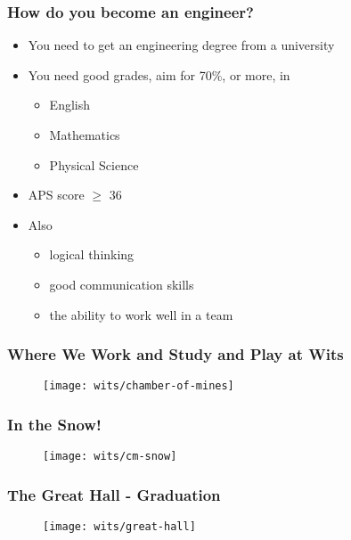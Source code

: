 \documentclass{beamer}
\begin{document}
\begin{frame}
\frametitle{How do you become an engineer?}
  \begin{itemize}
    \item You need to get an engineering degree from a university
    \item You need good grades, aim for 70\%, or more, in
    \begin{itemize}
      \item English
      \item Mathematics
      \item Physical Science 
    \end{itemize}
    \item APS score $\ge$ 36 
    \item Also 
    \begin{itemize}
       \item logical thinking
       \item good communication skills
       \item the ability to work well in a team
  \end{itemize}
  \end{itemize}
\end{frame}

\begin{frame}
  \frametitle{Where We Work and Study and Play at Wits}
  \begin{figure}
  \centering
  \texttt{[image: wits/chamber-of-mines]}
  \end{figure}
\end{frame}

\begin{frame}
  \frametitle{In the Snow!}
  \begin{figure}
  \centering
  \texttt{[image: wits/cm-snow]}
  \end{figure}
\end{frame}

\begin{frame}
  \frametitle{The Great Hall - Graduation}
  \begin{figure}
  \centering
  \texttt{[image: wits/great-hall]}
  \end{figure}
\end{frame}
\end{document}

